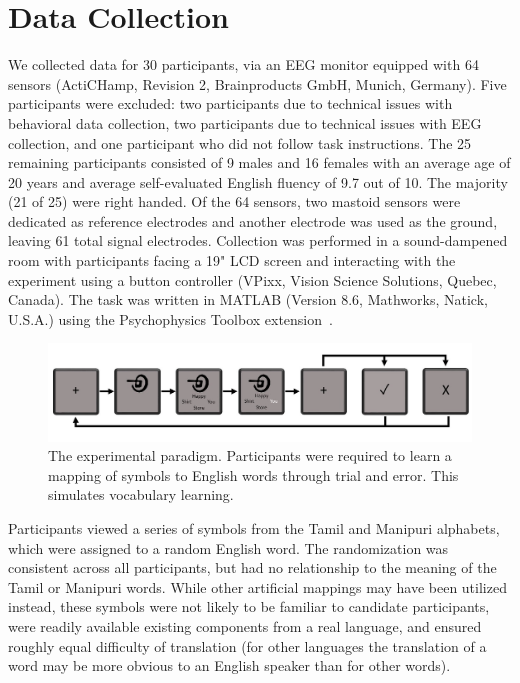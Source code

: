 \section{Data Collection}

We collected data for 30 participants, via an EEG monitor equipped with 64 
sensors (ActiCHamp, Revision 2, Brainproducts GmbH, Munich, Germany). Five 
participants were excluded: two participants due to technical issues with 
behavioral data collection, two participants due to technical issues with EEG 
collection, and one participant who did not follow task instructions. The 25 
remaining participants consisted of 9 males and 16 females with an average age 
of 20 years and average self-evaluated English fluency of 9.7 out of 10.  The 
majority (21 of 25) were right handed. Of the 64 sensors, two mastoid sensors 
were dedicated as reference electrodes and another electrode was used as the 
ground, leaving 61 total signal electrodes.  Collection was performed in a 
sound-dampened room with participants facing a 19" LCD screen and interacting 
with the experiment using a button controller (VPixx, Vision Science Solutions, 
Quebec, Canada).  The task was written in MATLAB (Version 8.6, Mathworks, 
Natick, U.S.A.) using the Psychophysics Toolbox 
extension~\cite{brainard1997psychophysics}.

\begin{figure}[t]
  \centering
  \includegraphics[width=\linewidth]{figures/experiment}
  \caption[Experiment Paradigm]{
    The experimental paradigm. Participants were required to learn a mapping of 
    symbols to English words through trial and error. This simulates vocabulary 
    learning.
  }
  \label{fig:experiment}
\end{figure}

Participants viewed a series of symbols from the Tamil and Manipuri alphabets, 
which were assigned to a random English word. The randomization was consistent 
across all participants, but had no relationship to the meaning of the Tamil or 
Manipuri words. While other artificial mappings may have been utilized instead, 
these symbols were not likely to be familiar to candidate participants, were 
readily available existing components from a real language, and ensured roughly 
equal difficulty of translation (for other languages the translation of a word 
may be more obvious to an English speaker than for other words).

